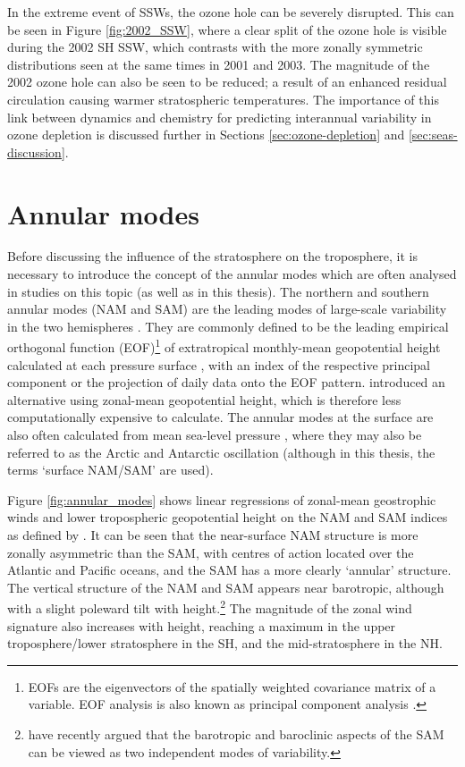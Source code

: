 
In the extreme event of SSWs, the ozone hole can be severely disrupted. This can
be seen in Figure \ref{fig:2002_SSW}, where a clear split of the ozone hole is
visible during the 2002 SH SSW, which contrasts with the more zonally symmetric
distributions seen at the same times in 2001 and 2003. The magnitude of the 2002
ozone hole can also be seen to be reduced; a result of an enhanced residual
circulation causing warmer stratospheric temperatures. The importance of this
link between dynamics and chemistry for predicting interannual variability in
ozone depletion is discussed further in Sections \ref{sec:ozone-depletion} and
\ref{sec:seas-discussion}.

\section{Annular modes}
\label{sec:annular-modes}
Before discussing the influence of the stratosphere on the troposphere, it is
necessary to introduce the concept of the annular modes which are often analysed
in studies on this topic (as well as in this thesis). The northern and southern
annular modes (NAM and SAM) are the leading modes of large-scale variability in
the two hemispheres
\citep{Baldwin1999,Thompson2000a,Thompson2000,Limpasuvan1999,Limpasuvan2000}. They
are commonly defined to be the leading empirical orthogonal function
(EOF)\footnote{EOFs are the eigenvectors of the spatially weighted covariance
  matrix of a variable. EOF analysis is also known as principal component
  analysis \citep{Wilks}.} of extratropical monthly-mean geopotential height
calculated at each pressure surface \citep[e.g.,][]{Baldwin1999}, with an index
of the respective principal component or the projection of daily data onto the
EOF pattern. \citet{Baldwin2009} introduced an alternative using zonal-mean
geopotential height, which is therefore less computationally expensive to
calculate. The annular modes at the surface are also often calculated from mean
sea-level pressure \citep[e.g.,][]{Gong1999}, where they may also be referred to
as the Arctic and Antarctic oscillation (although in this thesis, the terms
`surface NAM/SAM' are used).

Figure \ref{fig:annular_modes} shows linear regressions of zonal-mean
geostrophic winds and lower tropospheric geopotential height on the NAM and SAM
indices as defined by \citet{Thompson2000a}. It can be seen that the
near-surface NAM structure is more zonally asymmetric than the SAM, with centres
of action located over the Atlantic and Pacific oceans, and the SAM has a more
clearly `annular' structure. The vertical structure of the NAM and SAM appears
near barotropic, although with a slight poleward tilt with
height.\footnote{\citet{Thompson2014} have recently argued that the barotropic
  and baroclinic aspects of the SAM can be viewed as two independent modes of
  variability.} The magnitude of the zonal wind signature also increases with
height, reaching a maximum in the upper troposphere/lower stratosphere in the
SH, and the mid-stratosphere in the NH.

